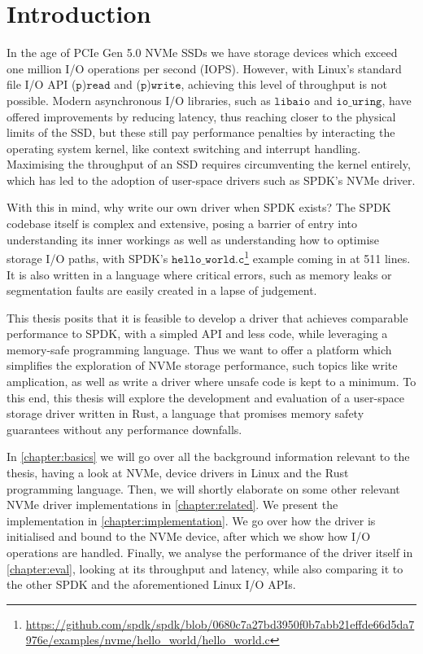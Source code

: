 \chapter{Introduction}\label{chapter:introduction}
In the age of PCIe Gen 5.0 NVMe SSDs we have storage devices which exceed one million I/O operations per second (IOPS). However, with Linux's standard file I/O API ($\texttt{p}$)$\texttt{read}$ and ($\texttt{p}$)$\texttt{write}$, achieving this level of throughput is not possible. Modern asynchronous I/O libraries, such as $\texttt{libaio}$ and $\texttt{io\_uring}$, have offered improvements by reducing latency, thus reaching closer to the physical limits of the SSD, but these still pay performance penalties by interacting the operating system kernel, like context switching and interrupt handling\cite{storage_api}. Maximising the throughput of an SSD requires circumventing the kernel entirely, which has led to the adoption of user-space drivers such as SPDK's NVMe driver.

With this in mind, why write our own driver when SPDK exists? The SPDK codebase itself is complex and extensive, posing a barrier of entry into understanding its inner workings as well as understanding how to optimise storage I/O paths, with SPDK's $\texttt{hello\_world.c}$\footnote{\url{https://github.com/spdk/spdk/blob/0680c7a27bd3950f0b7abb21effde66d5da7976e/examples/nvme/hello_world/hello_world.c}} example coming in at 511 lines. It is also written in a language where critical errors, such as memory leaks or segmentation faults are easily created in a lapse of judgement.

This thesis posits that it is feasible to develop a driver that achieves comparable performance to SPDK, with a simpled API and less code, while leveraging a memory-safe programming language. Thus we want to offer a platform which simplifies the exploration of NVMe storage performance, such topics like write amplication, as well as write a driver where unsafe code is kept to a minimum. To this end, this thesis will explore the development and evaluation of a user-space storage driver written in Rust, a language that promises memory safety guarantees without any performance downfalls.

In \autoref{chapter:basics} we will go over all the background information relevant to the thesis, having a look at NVMe, device drivers in Linux and the Rust programming language. Then, we will shortly elaborate on some other relevant NVMe driver implementations in \autoref{chapter:related}.
We present the implementation in \autoref{chapter:implementation}. We go over how the driver is initialised and bound to the NVMe device, after which we show how I/O operations are handled.
Finally, we analyse the performance of the driver itself in \autoref{chapter:eval}, looking at its throughput and latency, while also comparing it to the other SPDK and the aforementioned Linux I/O APIs.
